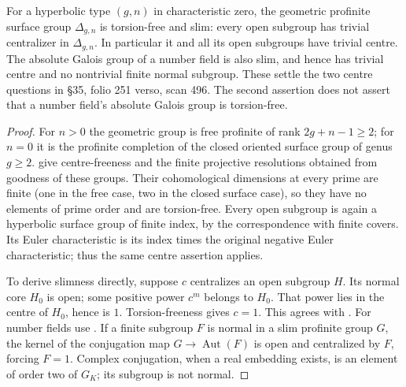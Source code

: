 For a hyperbolic type $(g,n)$ in characteristic zero, the geometric profinite
surface group $\Delta_{g,n}$ is torsion-free and slim: every open subgroup has
trivial centralizer in $\Delta_{g,n}$.  In particular it and all its open
subgroups have trivial centre.  The absolute Galois group of a number field
is also slim, and hence has trivial centre and no nontrivial finite normal
subgroup.  These settle the two centre questions in \S35, folio 251 verso,
scan 496.  The second assertion does not assert that a number field's
absolute Galois group is torsion-free.
\begin{proof}
For $n>0$ the geometric group is free profinite of rank $2g+n-1\geq2$;
for $n=0$ it is the profinite completion of the closed oriented surface group
of genus $g\geq2$.
\citet[Corollaries (1.3.3)--(1.3.4)]{Nakamura1994} give centre-freeness
and the finite projective resolutions obtained from goodness of these groups.
Their cohomological dimensions at every prime are finite (one in the free
case, two in the closed surface case), so they have no elements of prime
order and are torsion-free.  Every open subgroup is again a hyperbolic
surface group of finite index, by the correspondence with finite covers.
Its Euler characteristic is its index times the original negative Euler
characteristic; thus the same centre assertion applies.

To derive slimness directly, suppose $c$ centralizes an open subgroup $H$.
Its normal core $H_0$ is open; some positive power $c^m$ belongs to $H_0$.
That power lies in the centre of $H_0$, hence is $1$.  Torsion-freeness gives
$c=1$.  This agrees with \citet[Lemma 3.2]{Mochizuki2006}.
For number fields use \citet[Corollary 2.2]{Mochizuki2006}.
If a finite subgroup $F$ is normal in a slim profinite group $G$, the kernel
of the conjugation map $G\to\operatorname{Aut}(F)$ is open and centralized
by $F$, forcing $F=1$.  Complex conjugation, when a real embedding exists,
is an element of order two of $G_K$; its subgroup is not normal.
\end{proof}

